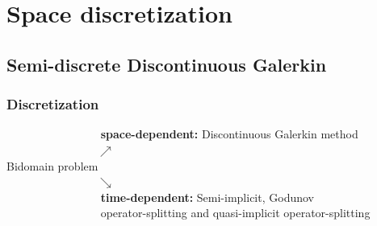 \documentclass[8pt]{beamer}
\begin{document}
\section{Space discretization}

\subsection{Semi-discrete Discontinuous Galerkin}
\begin{frame}
	\frametitle{Discretization}
	$\qquad \qquad \qquad \qquad $ \textbf{space-dependent:} Discontinuous Galerkin method\\\vspace{2mm}
	$\qquad \qquad \qquad \qquad \nearrow$\\
	Bidomain problem\\
	$\qquad \qquad \qquad \qquad \searrow$\\\vspace{2mm}
	$\qquad \qquad \qquad \qquad $ \textbf{time-dependent:} Semi-implicit, Godunov\\ $\qquad \qquad \qquad \qquad $ operator-splitting and quasi-implicit operator-splitting
\end{frame}
\end{document}
